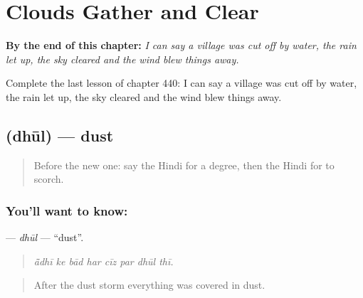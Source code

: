
\chapter{Clouds Gather and Clear}
\label{ch:hi-clouds-gather-and-clear}

\begin{chapteropening}
\textbf{By the end of this chapter:} \emph{I can say a village was cut off by water, the rain let up, the sky cleared and the wind blew things away.}

Complete the last lesson of chapter 440: I can say a village was cut off by water, the rain let up, the sky cleared and the wind blew things away.
\end{chapteropening}

\section[\texorpdfstring{\hi{धूल} (dhūl)}{धूल (dhūl)}]{ (dhūl) — dust}

\label{lesson:HI-C440-dhul}



\begin{quote}
Before the new one: say the Hindi for a degree, then the Hindi for to scorch.
\end{quote}

\subsection*{You'll want to know: }
\textbf{} — \emph{dhūl} — \textquotedblleft{}dust\textquotedblright{}.

\begin{quote}
       
\end{quote}

\begin{quote}
\emph{ā̃dhī ke bād har cīz par dhūl thī.}
\end{quote}

\begin{quote}
After the dust storm everything was covered in dust.
\end{quote}

